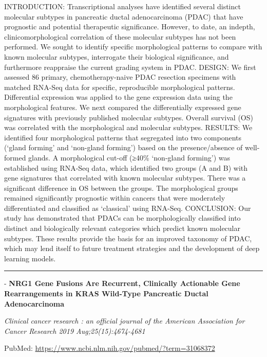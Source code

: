 \documentclass[]{article}
\begin{document}
INTRODUCTION: Transcriptional analyses have identified several distinct
molecular subtypes in pancreatic ductal adenocarcinoma (PDAC) that have
prognostic and potential therapeutic significance. However, to date, an
indepth, clinicomorphological correlation of these molecular subtypes
has not been performed. We sought to identify specific morphological
patterns to compare with known molecular subtypes, interrogate their
biological significance, and furthermore reappraise the current grading
system in PDAC. DESIGN: We first assessed 86 primary, chemotherapy-naive
PDAC resection specimens with matched RNA-Seq data for specific,
reproducible morphological patterns. Differential expression was applied
to the gene expression data using the morphological features. We next
compared the differentially expressed gene signatures with previously
published molecular subtypes. Overall survival (OS) was correlated with
the morphological and molecular subtypes. RESULTS: We identified four
morphological patterns that segregated into two components (`gland
forming' and `non-gland forming') based on the presence/absence of
well-formed glands. A morphological cut-off (≥40\% `non-gland forming')
was established using RNA-Seq data, which identified two groups (A and
B) with gene signatures that correlated with known molecular subtypes.
There was a significant difference in OS between the groups. The
morphological groups remained significantly prognostic within cancers
that were moderately differentiated and classified as `classical' using
RNA-Seq. CONCLUSION: Our study has demonstrated that PDACs can be
morphologically classified into distinct and biologically relevant
categories which predict known molecular subtypes. These results provide
the basis for an improved taxonomy of PDAC, which may lend itself to
future treatment strategies and the development of deep learning models.

{}

{}

\begin{center}\rule{0.5\linewidth}{\linethickness}\end{center}

 - \textbf{NRG1 Gene Fusions Are Recurrent, Clinically Actionable Gene
Rearrangements in KRAS Wild-Type Pancreatic Ductal Adenocarcinoma}

\emph{Clinical cancer research : an official journal of the American
Association for Cancer Research 2019 Aug;25(15):4674-4681}

PubMed: \url{https://www.ncbi.nlm.nih.gov/pubmed/?term=31068372}
\end{document}
